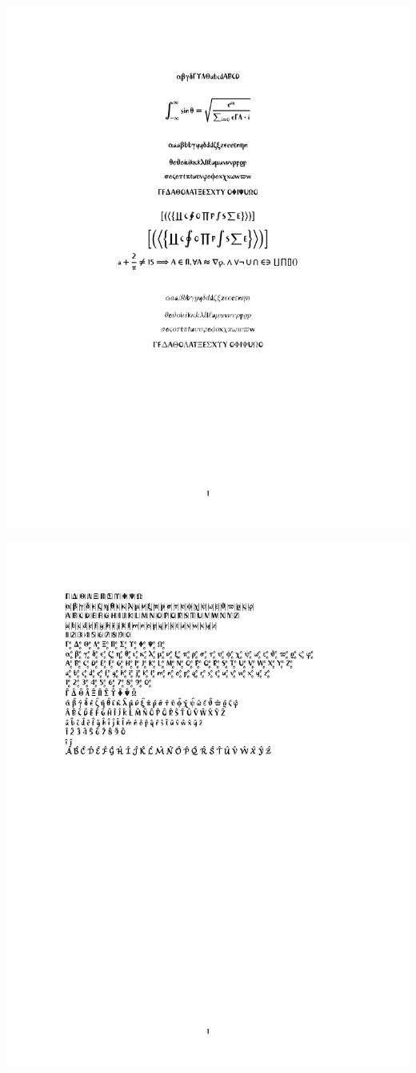 \documentclass[twocolumn]{article}
\begin{document}
 \noindent\includegraphics*{../results/khaki-font}\par
{} \noindent\includegraphics*{../results/khaki-pos}\par

\fi
\end{document}
